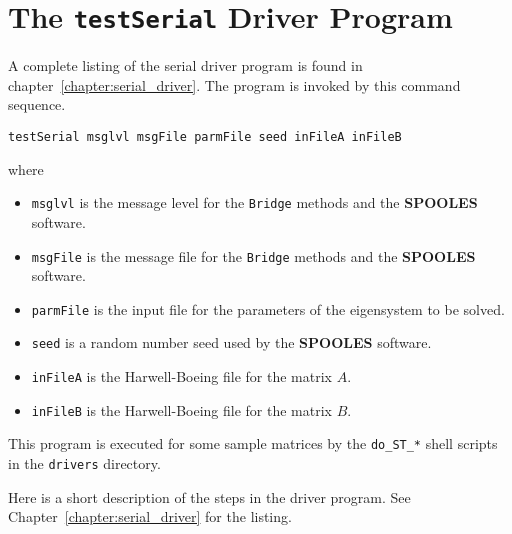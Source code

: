 \section{The \texttt{testSerial} Driver Program}
\label{section:Bridge:driver}
\par
A complete listing of the serial driver program is
found in chapter~\ref{chapter:serial_driver}.
The program is invoked by this command sequence.
\begin{verbatim}
testSerial msglvl msgFile parmFile seed inFileA inFileB
\end{verbatim}
where
\begin{itemize}
\item 
{\tt msglvl} is the message level for the {\tt Bridge}
methods and the {\bf SPOOLES} software.
\item 
{\tt msgFile} is the message file for the {\tt Bridge}
methods and the {\bf SPOOLES} software.
\item 
{\tt parmFile} is the input file for the parameters of the
eigensystem to be solved.
\item 
{\tt seed} is a random number seed
used by the {\bf SPOOLES} software.
\item 
{\tt inFileA} is the Harwell-Boeing file for the matrix $A$.
\item 
{\tt inFileB} is the Harwell-Boeing file for the matrix $B$.
\end{itemize}
This program is executed for some sample matrices by the
{\tt do\_ST\_*} shell scripts in the {\tt drivers} directory.
\par
Here is a short description of the steps in the driver program.
See Chapter~\ref{chapter:serial_driver} for the listing.
